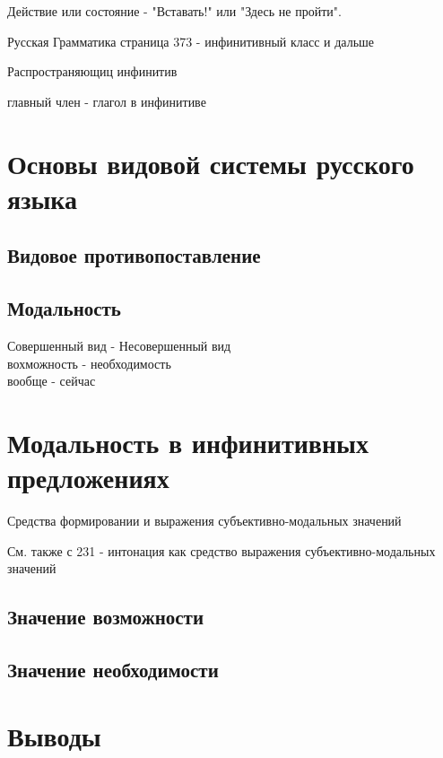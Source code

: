 \documentclass{article}
\begin{document}
Действие или состояние - "Вставать!" или "Здесь не пройти".

Русская Грамматика страница 373 - инфинитивный класс и дальше

Распространяющиц инфинитив

главный член - глагол в инфинитиве



\section{Основы видовой системы русского языка}

\subsection{Видовое противопоставление}

\subsection{Модальность}
	Совершенный вид -	Несовершенный вид \\
	вохможность 	- 	необходимость \\
	вообще 			-	сейчас \\


\section{Модальность в инфинитивных предложениях}

Средства формировании и выражения субъективно-модальных значений

См. также с 231 - интонация как средство выражения субъективно-модальных значений


\subsection{Значение возможности}

\subsection{Значение необходимости}



\section{Выводы}
\end{document}
